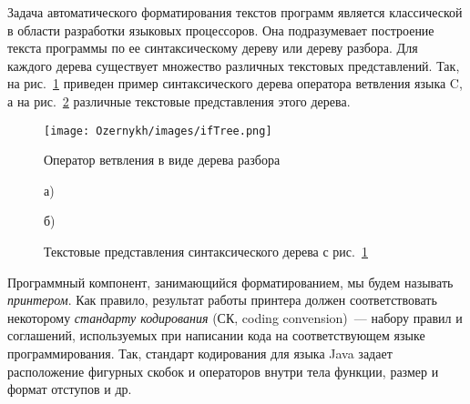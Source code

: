 Задача автоматического форматирования текстов программ является классической в области разработки языковых процессоров.
Она подразумевает построение текста программы по ее синтаксическому дереву или дереву разбора.
Для каждого дерева существует множество различных текстовых представлений.
Так, на рис.~\ref{fig:ifTree} приведен пример синтаксического дерева оператора ветвления языка C, а на рис.~\ref{intro:treeToCode} различные текстовые представления этого дерева.
\begin{figure}[h]
	\centering
	\texttt{[image: Ozernykh/images/ifTree.png]}
	\caption{Оператор ветвления в виде дерева разбора}
	\label{fig:ifTree}
\end{figure}
\noindent
{}
\begin{figure}[ht]
  \noindent
  \begin{minipage}{.4\textwidth}
    
    \vspace{1cm}
    \caption*{а) }    
  \end{minipage}
  \hfill
  \begin{minipage}{.5\textwidth}
    
    \caption*{б)}    
  \end{minipage}
  \caption{Текстовые представления синтаксического дерева с рис.~\ref{fig:ifTree}}
  \label{intro:treeToCode}
\end{figure}
\noindent
Программный компонент, занимающийся форматированием, мы будем называть \emph{принтером}.
Как правило, результат работы принтера должен соответствовать некоторому \emph{стандарту кодирования} (СК, coding convension)~--- набору правил и соглашений, используемых при написании кода на соответствующем языке программирования.
Так, стандарт кодирования для языка Java задает расположение фигурных скобок и операторов внутри тела функции, размер и формат отступов и др.

